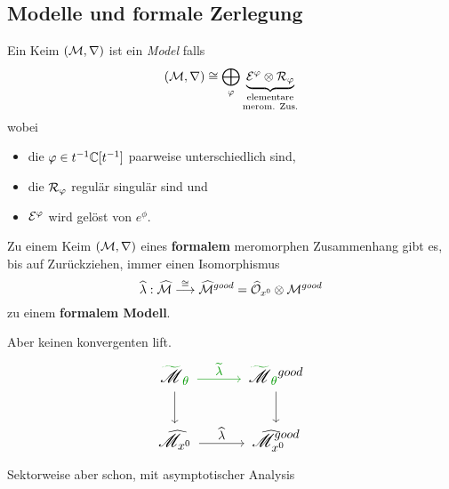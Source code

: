 \subsection{Modelle und formale Zerlegung}%
\begin{defn}
  Ein Keim $(\mathcal{M},\nabla)$ ist ein \emph{Model} falls
  \[
    (\cM,\nabla)
    \cong
    \bigoplus_\phi
    \underset{\text{merom. Zus.}}{%
      \underset{\text{elementare}}{%
        \underbrace{\cE^\phi\otimes\cR_\phi}
      }
    }
  \]
  wobei
  \begin{itemize}
    \item die $\varphi\in t^{-1}\mathbb{C}[t^{-1}]$ paarweise unterschiedlich sind,
    \item die $\mathcal{R}_\varphi$ regulär singulär sind und
    \item $\mathcal{E}^\varphi$ wird gelöst von $e^\phi$.
  \end{itemize}
\end{defn}
\begin{comment}
  \begin{lem}
    Ist $(\sM,\nabla)$ ein Modell\TODO[Oder Halm??], so lässt sich die
    Zusammenhangs Matrix schreiben als
    \[
      A^0=dQ+\Lambda\frac{dt}{t}
    \]
    wobei
    \begin{itemize}
      \item $Q=\diag(q_1,\dots,q_n)$ mit $q_i$ meromorph und
      \item $\Lambda$ diagonal und konstant ist.
    \end{itemize}
  \end{lem}
\end{comment}
\begin{paracol}{2}
  \begin{thm}
    Zu einem Keim $(\mathcal{M},\nabla)$ eines \textbf{formalem} meromorphen
    Zusammenhang gibt es, bis auf Zurückziehen, immer einen Isomorphismus
    \[
      \widehat\lambda:\widehat{\mathcal{M}}
      \overset{\cong}\longrightarrow
      \widehat{\mathcal{M}}^{good}
      =\widehat{\mathcal{O}}_{x^0}\otimes\mathcal{M}^{good}
    \]
    zu einem \textbf{formalem Modell}.
  \end{thm}
\switchcolumn
  \begin{rem}
    Aber keinen konvergenten lift.
    \[ \Large\begin{tikzcd}
        \textcolor{green!60!black}{\tilde{\textcolor{black}{\sM}}_{\theta}}\dar
        \rar[green!60!black]{\tilde\lambda}&
        \textcolor{green!60!black}{%
          \tilde{\textcolor{black}{\sM}}_{\theta}}^{good} \dar
        \\\hat\sM_{x^0} \rar{\hat\lambda} &
          \hat\sM_{x^0}^{good}
    \end{tikzcd} \]
    \textcolor{green!60!black}{Sektorweise aber schon, mit asymptotischer
    Analysis}
  \end{rem}
\end{paracol}

